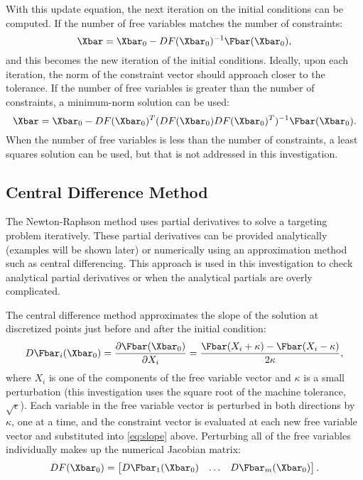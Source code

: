 With this update equation, the next iteration on the initial conditions can be
computed. If the number of free variables matches the number of constraints:
\begin{equation}
    \Xbar=\Xbar_{0}-DF(\Xbar_{0})^{-1}\Fbar(\Xbar_{0}),
    \label{eq:NRsolution}
\end{equation}
and this becomes the new iteration of the initial conditions. Ideally, upon
each iteration, the norm of the constraint vector should approach closer to the
tolerance. If the number of free variables is greater than the number of
constraints, a minimum-norm solution can be used:
\begin{equation}
    \Xbar=\Xbar_{0}-DF(\Xbar_{0})^{T}(DF(\Xbar_{0})DF(\Xbar_{0})^{T})^{-1}\Fbar(\Xbar_{0}).
    \label{eq:minimumnorm}
\end{equation}
When the number of free variables is less than the number of constraints, a
least squares solution can be used, but that is not addressed in this
investigation.

\subsection{Central Difference Method}
The Newton-Raphson method uses partial derivatives to solve a targeting problem
iteratively. These partial derivatives can be provided analytically (examples
will be shown later) or numerically using an approximation method such as
central differencing. This approach is used in this investigation to check
analytical partial derivatives or when the analytical partials are overly
complicated.

The central difference method approximates the slope of the solution at
discretized points just before and after the initial condition:
\begin{equation}
    D\Fbar_{i}(\Xbar_{0})=\frac{\partial\Fbar(\Xbar_{0})}{\partial X_{i}}=\frac{\Fbar(X_{i}+\kappa)-\Fbar(X_{i}-\kappa)}{2\kappa},
    \label{eq:slope}
\end{equation}
where $X_{i}$ is one of the components of the free variable vector and $\kappa$
is a small perturbation (this investigation uses the square root of the machine
tolerance, $\sqrt{\epsilon}$). Each variable in the free variable vector is
perturbed in both directions by $\kappa$, one at a time, and the constraint
vector is evaluated at each new free variable vector and substituted into
\cref{eq:slope} above. Perturbing all of the free variables individually makes
up the numerical Jacobian matrix:
\begin{equation}
    DF(\Xbar_{0})=\begin{bmatrix}   D\Fbar_{1}(\Xbar_{0})   &   \dots   &   D\Fbar_{m}(\Xbar_{0})\end{bmatrix}.
    \label{eq:centraldifference}
\end{equation}
